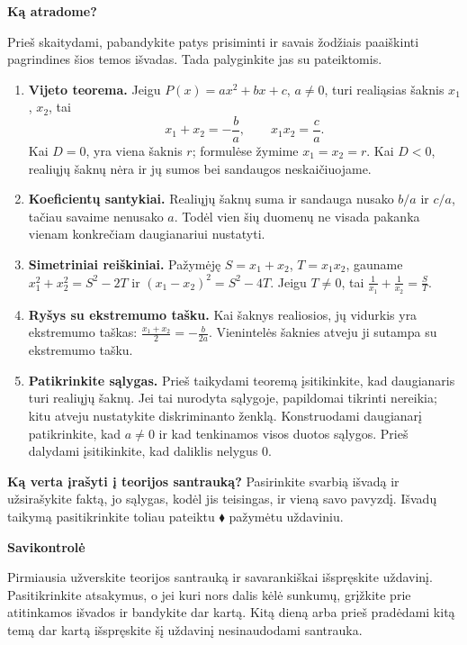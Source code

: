 \documentclass[12pt,a4paper]{article}
\begin{document}
\newpage
\begin{center}{\Large\bfseries Ką atradome?}\end{center}
Prieš skaitydami, pabandykite patys prisiminti ir savais žodžiais paaiškinti pagrindines šios temos išvadas. Tada palyginkite jas su pateiktomis.
\begin{tcolorbox}[title=Svarbiausios temos išvados,colback=black!3,colframe=black!65,boxrule=0.6pt,arc=2mm]
\begin{enumerate}
\item \textbf{Vijeto teorema.} Jeigu $P(x)=ax^2+bx+c$, $a\ne0$, turi realiąsias šaknis $x_1$, $x_2$, tai
\[x_1+x_2=-\frac{b}{a},\qquad x_1x_2=\frac{c}{a}.\]
Kai $D=0$, yra viena šaknis $r$; formulėse žymime $x_1=x_2=r$. Kai $D<0$, realiųjų šaknų nėra ir jų sumos bei sandaugos neskaičiuojame.
\item \textbf{Koeficientų santykiai.} Realiųjų šaknų suma ir sandauga nusako $b/a$ ir $c/a$, tačiau savaime nenusako $a$. Todėl vien šių duomenų ne visada pakanka vienam konkrečiam daugianariui nustatyti.
\item \textbf{Simetriniai reiškiniai.} Pažymėję $S=x_1+x_2$, $T=x_1x_2$, gauname $x_1^2+x_2^2=S^2-2T$ ir $(x_1-x_2)^2=S^2-4T$. Jeigu $T\ne0$, tai $\frac1{x_1}+\frac1{x_2}=\frac ST$.
\item \textbf{Ryšys su ekstremumo tašku.} Kai šaknys realiosios, jų vidurkis yra ekstremumo taškas: $\frac{x_1+x_2}{2}=-\frac{b}{2a}$. Vienintelės šaknies atveju ji sutampa su ekstremumo tašku.
\item \textbf{Patikrinkite sąlygas.} Prieš taikydami teoremą įsitikinkite, kad daugianaris turi realiųjų šaknų. Jei tai nurodyta sąlygoje, papildomai tikrinti nereikia; kitu atveju nustatykite diskriminanto ženklą. Konstruodami daugianarį patikrinkite, kad $a\ne0$ ir kad tenkinamos visos duotos sąlygos. Prieš dalydami įsitikinkite, kad daliklis nelygus $0$.
\end{enumerate}
\end{tcolorbox}
\textbf{Ką verta įrašyti į teorijos santrauką?} Pasirinkite svarbią išvadą ir užsirašykite faktą, jo sąlygas, kodėl jis teisingas, ir vieną savo pavyzdį. Išvadų taikymą pasitikrinkite toliau pateiktu $\blacklozenge$ pažymėtu uždaviniu.
\newpage
\begin{center}{\Large\bfseries Savikontrolė}\end{center}
Pirmiausia užverskite teorijos santrauką ir savarankiškai išspręskite uždavinį. Pasitikrinkite atsakymus, o jei kuri nors dalis kėlė sunkumų, grįžkite prie atitinkamos išvados ir bandykite dar kartą. Kitą dieną arba prieš pradėdami kitą temą dar kartą išspręskite šį uždavinį nesinaudodami santrauka.
\end{document}
